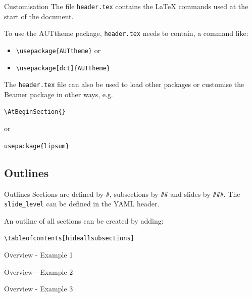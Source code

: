 \documentclass[
  ignorenonframetext,
  aspectratio=169]{beamer}
\providecommand{\tightlist}{%
  \setlength{\itemsep}{0pt}\setlength{\parskip}{0pt}}
\begin{document}
\begin{frame}[fragile]{Customisation}
The file \texttt{header.tex} contains the LaTeX commands used at the
start of the document.

To use the AUTtheme package, \texttt{header.tex} needs to contain, a
command like:

\begin{itemize}
\tightlist
\item
  \texttt{\textbackslash{}usepackage\{AUTtheme\}} or
\item
  \texttt{\textbackslash{}usepackage{[}dct{]}\{AUTtheme\}}
\end{itemize}

The \texttt{header.tex} file can also be used to load other packages or
customise the Beamer package in other ways, e.g.

\texttt{\textbackslash{}AtBeginSection\{\}}

or

\texttt{usepackage\{lipsum\}}
\end{frame}

\hypertarget{outlines}{%
\subsection{Outlines}\label{outlines}}

\begin{frame}[fragile]{Outlines}
Sections are defined by \texttt{\#}, subsections by \texttt{\#\#} and
slides by \texttt{\#\#\#}. The \texttt{slide\_level} can be defined in
the YAML header.

An outline of all sections can be created by adding:

\texttt{\textbackslash{}tableofcontents{[}hideallsubsections{]}}
\end{frame}

\begin{frame}{Overview - Example 1}
\protect\hypertarget{overview---example-1}{}
\tableofcontents[hideallsubsections]
\end{frame}

\begin{frame}{Overview - Example 2}
\protect\hypertarget{overview---example-2}{}
\tableofcontents[
        currentsection,
      sectionstyle=show/shaded,
      subsectionstyle = hide/hide/hide
    ]
\end{frame}

\begin{frame}{Overview - Example 3}
\protect\hypertarget{overview---example-3}{}
\tableofcontents[
        currentsection,
      sectionstyle=show/shaded,
      subsectionstyle=show/shaded/hide
    ]
\end{frame}
\end{document}
